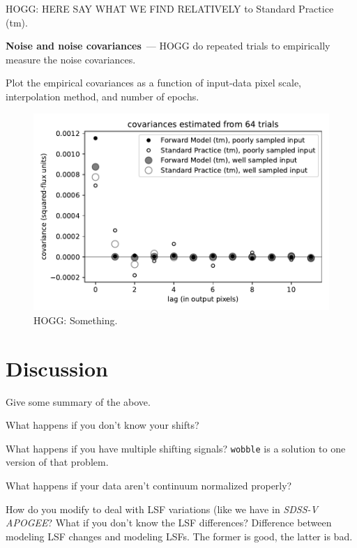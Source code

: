 \documentclass[11pt]{article}
\renewcommand{\paragraph}[1]{\medskip\par\noindent\textbf{#1}~---}
\newlength{\figurewidth}
\begin{document}
HOGG: HERE SAY WHAT WE FIND RELATIVELY to Standard Practice (tm).

\paragraph{Noise and noise covariances}
HOGG do repeated trials to empirically measure the noise covariances.

Plot the empirical covariances as a function of input-data pixel scale, interpolation method, and number of epochs.
\begin{figure}[t!]
    \begin{mdframed}\begin{center}
    \includegraphics[width=\figurewidth]{notebooks/noise.pdf}
    \end{center}
    \caption{HOGG: Something.}
    \label{fig:noise}
    \end{mdframed}
\end{figure}

\section{Discussion}\label{sec:discussion}

Give some summary of the above.

What happens if you don't know your shifts?

What happens if you have multiple shifting signals?
\texttt{wobble} \cite{wobble} is a solution to one version of that problem.

What happens if your data aren't continuum normalized properly?

How do you modify to deal with LSF variations (like we have in \textsl{SDSS-V APOGEE}?
What if you don't know the LSF differences?
Difference between modeling LSF changes and modeling LSFs. The former is good, the latter is bad.
\end{document}
